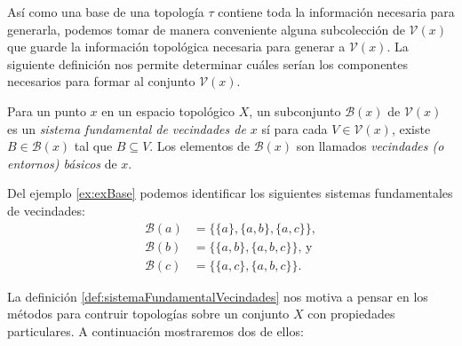Así como una base de una topología $\tau$ contiene toda la información necesaria para generarla, podemos tomar de manera conveniente alguna subcolección de $\mathcal{V}(x)$ que guarde la información topológica necesaria para generar a $\mathcal{V}(x)$. La siguiente definición nos permite determinar cuáles serían los componentes necesarios para formar al conjunto $\mathcal{V}(x)$.

\begin{definition}\label{def:sistemaFundamentalVecindades}
Para un punto $x$ en un espacio topológico $X$, un subconjunto $\mathcal{B}(x)$ de $\mathcal{V}(x)$ es un \textit{sistema fundamental de vecindades de $x$} sí para cada $V\in\mathcal{V}(x)$, existe $B\in\mathcal{B}(x)$ tal que $B\subseteq V$. Los elementos de $\mathcal{B}(x)$ son llamados \textit{vecindades (o entornos) básicos} de $x$.
\end{definition}

\begin{example}\label{ex:sistemaFundamentalVecindades}
Del ejemplo \ref{ex:exBase} podemos identificar los siguientes sistemas fundamentales de vecindades:
\begin{align*}
    \mathcal{B}(a) &= \{\{a\},\{a,b\},\{a,c\}\},\\
    \mathcal{B}(b) &= \{\{a,b\},\{a,b,c\}\}\text{, y }\\
    \mathcal{B}(c) &= \{\{a,c\},\{a,b,c\}\}.
\end{align*}
\end{example}

La definición \ref{def:sistemaFundamentalVecindades} nos motiva a pensar en los métodos para contruir topologías sobre un conjunto $X$ con propiedades particulares. A continuación mostraremos dos de ellos:

